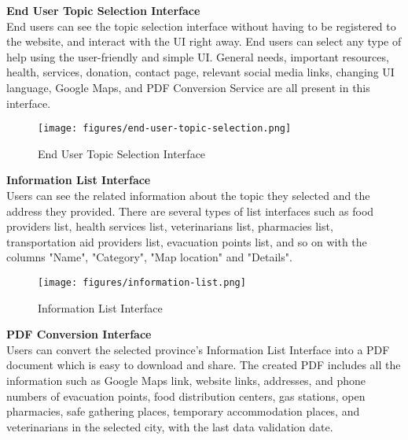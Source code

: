 \documentclass[listof=nochaptergap]{report}
\begin{document}
            \textbf{End User Topic Selection Interface} \\

            
            End users can see the topic selection interface without having to be registered to the website, and interact with the UI right away. End users can select any type of help using the user-friendly and simple UI. General needs, important resources, health, services, donation, contact page, relevant social media links, changing UI language, Google Maps, and PDF Conversion Service are all present in this interface.
            \begin{center}
                \begin{figure}[H]
                    \centering
                    \texttt{[image: figures/end-user-topic-selection.png]}
                    \caption{End User Topic Selection Interface}
                    \label{fig:figure1}
                \end{figure}
            \end{center}

            \newpage
            
            \textbf{Information List Interface} \\

            Users can see the related information about the topic they selected and the address they provided. There are several types of list interfaces such as food providers list, health services list, veterinarians list, pharmacies list, transportation aid providers list, evacuation points list, and so on with the columns "Name", "Category", "Map location" and "Details".
            
            \begin{center}
                \begin{figure}[H]
                    \centering
                    \texttt{[image: figures/information-list.png]}
                    \caption{Information List Interface}
                    \label{fig:figure2}
                \end{figure}
            \end{center}

            \newpage

            \textbf{PDF Conversion Interface} \\

            Users can convert the selected province's Information List Interface into a PDF document which is easy to download and share. The created PDF includes all the information such as Google Maps link, website links, addresses, and phone numbers of evacuation points, food distribution centers, gas stations, open pharmacies, safe gathering places, temporary accommodation places, and veterinarians in the selected city, with the last data validation date.
            
\end{document}
